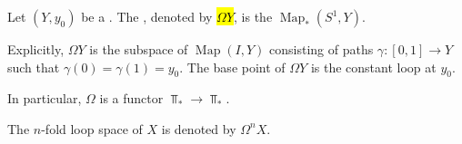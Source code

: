 \begin{definition} \label{definition:based_loop_space_of_a_pointed_topological_space}
    Let $(Y, y_0)$ be a . 
    The , denoted by \hl{$\Omega Y$}, is the  $\operatorname{Map}_*(S^1, Y)$.
    
    Explicitly, $\Omega Y$ is the subspace of $\operatorname{Map}(I, Y)$ consisting of paths $\gamma : [0,1] \to Y$ such that $\gamma(0) = \gamma(1) = y_0$. The base point of $\Omega Y$ is the constant loop at $y_0$.

    In particular, $\Omega$ is a functor $\Top_* \to \Top_*$. 

    The $n$-fold loop space of $X$ is denoted by $\Omega^n X$.
\end{definition}